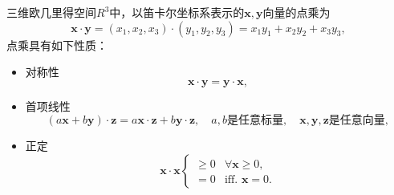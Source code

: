 三维欧几里得空间$R^3$中，以笛卡尔坐标系表示的$\bm{x},\bm{y}$向量的点乘为
\begin{equation*}
  \bm{x} \cdot \bm{y} = \left( x_1, x_2, x_3 \right) \cdot \left( y_1,y_2,y_3 \right) = x_1 y_1 + x_2 y_2 + x_3 y_3,
\end{equation*}
点乘具有如下性质：
\begin{itemize}
  \item 对称性
  \begin{equation*}
    \bm{x} \cdot \bm{y} = \bm{y} \cdot \bm{x},
  \end{equation*}
  \item 首项线性
  \begin{equation*}
    \left( a \bm{x} + b \bm{y} \right) \cdot \bm{z} = a \bm{x} \cdot \bm{z} + b \bm{y} \cdot \bm{z}, \quad a,b \text{是任意标量}, \quad  \bm{x},\bm{y},\bm{z} \text{是任意向量},
  \end{equation*}
  \item 正定
  \begin{equation*}
    \bm{x} \cdot \bm{x} \begin{cases}
     \ge 0 & \forall \bm{x} \ge 0, \\
     =0 & \text{iff. } \bm{x} = 0.
    \end{cases}
  \end{equation*}
\end{itemize}

